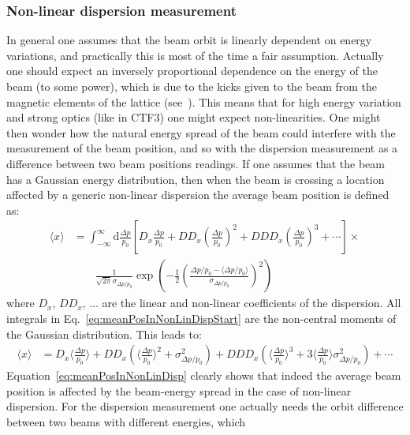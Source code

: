\subsubsection{Non-linear dispersion measurement}
%
In general one assumes that the beam orbit is linearly dependent on energy variations,
and practically this is most of the time a fair assumption.
Actually one should expect an inversely proportional dependence on the energy of the beam
(to some power), which is due to the kicks given to the beam from the magnetic elements
of the lattice (see~\cite{bib:DavideThesis}).
This means that for high energy variation and strong optics (like in CTF3) one might
expect non-linearities.
%
One might then wonder how the natural energy spread of the beam could interfere with the
measurement of the beam position,
and so with the dispersion measurement as a difference between two beam positions
readings.
If one assumes that the beam has a Gaussian energy distribution, then when the beam is
crossing a location affected by a generic non-linear dispersion the average beam position
is defined as:
%
\begin{align}
\langle x \rangle &=
\int_{-\infty}^\infty \mathrm{d}\frac{\Delta p}{p_0} \left[
D_x \frac{\Delta p}{p_0} +
DD_x \left(\frac{\Delta p}{p_0}\right)^2 +
DDD_x \left(\frac{\Delta p}{p_0}\right)^3 +
\cdots \right] \times \nonumber \\
&\qquad  \frac{1}{\sqrt{2\pi} \sigma_{\Delta p/p_0} } \exp \left( -\frac{1}{2} \left(\frac{\Delta p/p_0 - \langle \Delta p/p_0 \rangle}{\sigma_{\Delta p / p_0}} \right)^2 \right)
\label{eq:meanPosInNonLinDispStart}
\end{align}
%
where $D_x$, $DD_x$, ... are the linear and non-linear coefficients of the dispersion.
All integrals in Eq.~\ref{eq:meanPosInNonLinDispStart} are the non-central moments of the
Gaussian distribution.
This leads to:
%
\begin{align}
\langle x \rangle &=
D_x \langle \frac{\Delta p}{p_0} \rangle +
DD_x \left( \langle \frac{\Delta p}{p_0} \rangle^2 +  \sigma_{\Delta p / p_0}^2 \right) +
DDD_x \left( \langle \frac{\Delta p}{p_0} \rangle^3 +  3 \langle \frac{\Delta p}{p_0} \rangle \sigma_{\Delta p / p_0}^2
\right) +
\cdots
\label{eq:meanPosInNonLinDisp}
\end{align}
%
Equation~\ref{eq:meanPosInNonLinDisp} clearly shows that indeed the average beam position
is affected by the
beam-energy spread in the case of non-linear dispersion.
For the dispersion measurement one actually needs the orbit difference between two beams
with different energies, which

